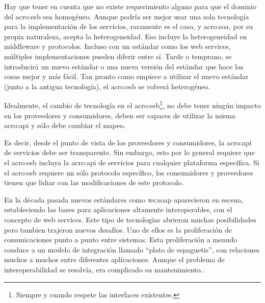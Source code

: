 Hay que tener en cuenta que no existe requerimiento alguno para que el dominio del \gls{acro:esb} sea homogéneo. Aunque podría ser mejor usar una sola tecnología para la implementación de los servicios, raramente es el caso, y \gls{acro:soa}, por su propia naturaleza, acepta la heterogeneidad. Eso incluye la heterogeneidad en middleware y protocolos. Incluso con un estándar como los web services, múltiples implementaciones pueden diferir entre sí. Tarde o temprano, se introducirá un nuevo estándar o una nueva versión del estándar que hace las cosas mejor y más fácil. Tan pronto como empiece a utilizar el nuevo estándar (junto a la antigua tecnología), el \gls{acro:esb} se volverá heterogéneo\cite[p.~49]{josuttis2007}.

Idealmente, el cambio de tecnología en el \gls{acro:esb}\footnote{Siempre y cuando respete las interfaces existentes.}, no debe tener ningún impacto en los proveedores y consumidores,  deben ser capaces de utilizar la misma \gls{acro:api} y sólo debe cambiar el mapeo.

Es decir, desde el punto de vista de los proveedores y consumidores, la \gls{acro:api} de servicios debe ser transparente. Sin embargo, esto por lo general requiere que el \gls{acro:esb} incluya la \gls{acro:api} de servicios para cualquier plataforma específica. Si el \gls{acro:esb} requiere un sólo protocolo específico, los consumidores y proveedores tienen que lidiar con las modificaciones de este protocolo\cite[p.~50]{josuttis2007}.


En la década pasada nuevos estándares como \gls{ws:soap} aparecieron en escena, estableciendo las bases para aplicaciones altamente interoperables, con el concepto de web services. Este tipo de tecnologías abrieron muchas posibilidades pero tambien trajeron nuevos desafíos. Uno de ellos es la proliferación de comunicaciones punto a punto entre sistemas. Esta proliferación a menudo conduce a un modelo de integración llamado ``plato de espaguetis'', con relaciones muchos a muchos entre diferentes aplicaciones. Aunque el problema de interoperabilidad se resolvía, era complicado su mantenimiento.\cite[p.~4]{dossotandemic2010}.

